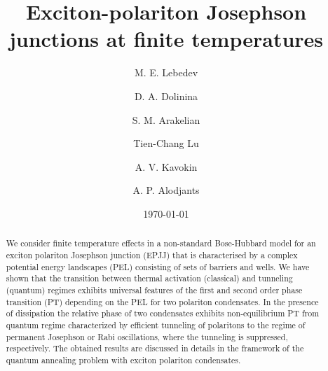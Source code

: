 \documentclass[aps, pre, preprint, groupedaddress, superscriptaddress, showkeys, showpacs] {revtex4-1}
\begin{document}
\title{{Exciton-polariton Josephson junctions at finite temperatures}}

\author{M. E. Lebedev}

\author{D. A. Dolinina}

\author{S. M. Arakelian}

\author{Tien-Chang Lu}

\author{A. V. Kavokin}

\author{A. P. Alodjants}

\date{\today}

\begin{abstract}
We consider finite temperature effects in a non-standard Bose-Hubbard model for an exciton polariton Josephson junction (EPJJ) that is characterised by a complex potential energy landscapes (PEL) consisting of sets of barriers and wells.
We have shown that the transition between  thermal  activation (classical) and tunneling (quantum) regimes exhibits universal features of the first and second order phase transition (PT) depending on the PEL for two polariton condensates.
In the presence of dissipation the relative phase of two condensates exhibits non-equilibrium PT from quantum regime characterized by efficient tunneling of polaritons to the regime of permanent Josephson or Rabi oscillations, where the tunneling is suppressed, respectively.
The obtained results are discussed in details in the framework of the quantum annealing problem with exciton polariton condensates.   
 
\end{abstract}

\pacs{\dots}
\keywords{\dots}

\maketitle
\end{document}
